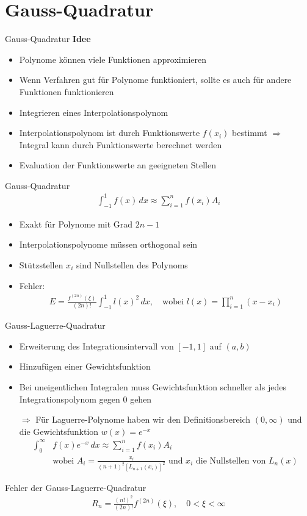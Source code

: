 \section{Gauss-Quadratur}

\begin{frame}{Gauss-Quadratur}
\textbf{Idee}
\begin{itemize}[<+->]
\item Polynome können viele Funktionen approximieren
\item Wenn Verfahren gut für Polynome funktioniert,
sollte es auch für andere Funktionen funktionieren
\item Integrieren eines Interpolationspolynom
\item Interpolationspolynom ist durch Funktionswerte $f(x_i)$ bestimmt
$\Rightarrow$ Integral kann durch Funktionswerte berechnet werden
\item Evaluation der Funktionswerte an geeigneten Stellen
\end{itemize}
\end{frame}

\begin{frame}{Gauss-Quadratur}
\begin{align*}
\int_{-1}^{1} f(x) \, dx
\approx
\sum_{i=1}^n f(x_i) A_i
\end{align*}

\begin{itemize}[<+->]
\item Exakt für Polynome mit Grad $2n-1$
\item Interpolationspolynome müssen orthogonal sein
\item Stützstellen $x_i$ sind Nullstellen des Polynoms
\item Fehler:
\begin{align*}
E
=
\frac{f^{(2n)}(\xi)}{(2n)!} \int_{-1}^{1} l(x)^2 \, dx
,\quad
\text{wobei }
l(x) = \prod_{i=1}^n (x-x_i)
\end{align*}
\end{itemize}
\end{frame}

\begin{frame}{Gauss-Laguerre-Quadratur}
\begin{itemize}[<+->]
\item Erweiterung des Integrationsintervall von $[-1, 1]$ auf $(a, b)$
\item Hinzufügen einer Gewichtsfunktion
\item Bei uneigentlichen Integralen muss Gewichtsfunktion schneller als jedes
Integrationspolynom gegen $0$ gehen
\item[$\Rightarrow$] Für Laguerre-Polynome haben wir den Definitionsbereich
$(0, \infty)$ und die Gewichtsfunktion $w(x) = e^{-x}$
\begin{align*}
\int_0^\infty & f(x) e^{-x} \, dx
\approx
\sum_{i=1}^n f(x_i) A_i
\\
                & \text{wobei }
A_i = \frac{x_i}{(n+1)^2 \left[ L_{n+1}(x_i) \right]^2}
\text{ und $x_i$ die Nullstellen von $L_n(x)$}
\end{align*}
\end{itemize}
\end{frame}

\begin{frame}{Fehler der Gauss-Laguerre-Quadratur}
\begin{align*}
R_n
=
\frac{(n!)^2}{(2n)!} f^{(2n)}(\xi)
,\quad
0 < \xi < \infty
\end{align*}
\end{frame}